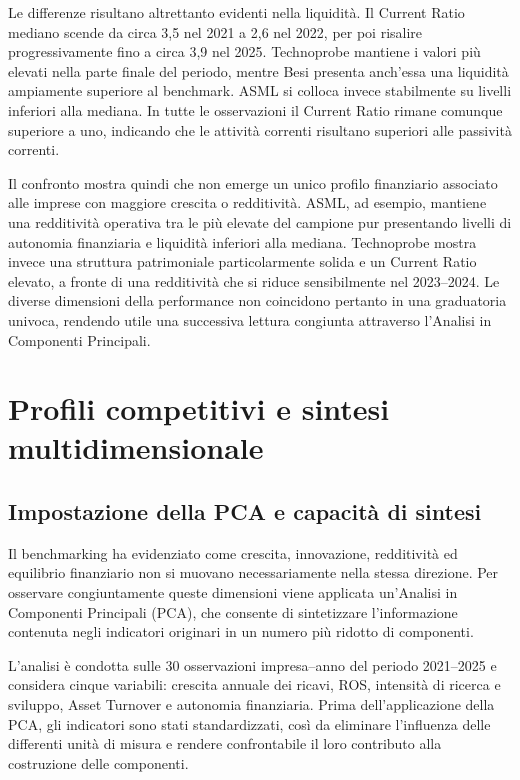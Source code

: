 \documentclass[11pt,a4paper]{article}
\begin{document}
Le differenze risultano altrettanto evidenti nella liquidità. Il Current Ratio mediano scende da circa 3,5 nel 2021 a 2,6 nel 2022, per poi risalire progressivamente fino a circa 3,9 nel 2025. Technoprobe mantiene i valori più elevati nella parte finale del periodo, mentre Besi presenta anch'essa una liquidità ampiamente superiore al benchmark. ASML si colloca invece stabilmente su livelli inferiori alla mediana. In tutte le osservazioni il Current Ratio rimane comunque superiore a uno, indicando che le attività correnti risultano superiori alle passività correnti.

Il confronto mostra quindi che non emerge un unico profilo finanziario associato alle imprese con maggiore crescita o redditività. ASML, ad esempio, mantiene una redditività operativa tra le più elevate del campione pur presentando livelli di autonomia finanziaria e liquidità inferiori alla mediana. Technoprobe mostra invece una struttura patrimoniale particolarmente solida e un Current Ratio elevato, a fronte di una redditività che si riduce sensibilmente nel 2023--2024. Le diverse dimensioni della performance non coincidono pertanto in una graduatoria univoca, rendendo utile una successiva lettura congiunta attraverso l'Analisi in Componenti Principali.

\section{Profili competitivi e sintesi multidimensionale}

\subsection{Impostazione della PCA e capacità di sintesi}

Il benchmarking ha evidenziato come crescita, innovazione, redditività ed equilibrio finanziario non si muovano necessariamente nella stessa direzione. Per osservare congiuntamente queste dimensioni viene applicata un'Analisi in Componenti Principali (PCA), che consente di sintetizzare l'informazione contenuta negli indicatori originari in un numero più ridotto di componenti.

L'analisi è condotta sulle 30 osservazioni impresa--anno del periodo 2021--2025 e considera cinque variabili: crescita annuale dei ricavi, ROS, intensità di ricerca e sviluppo, Asset Turnover e autonomia finanziaria. Prima dell'applicazione della PCA, gli indicatori sono stati standardizzati, così da eliminare l'influenza delle differenti unità di misura e rendere confrontabile il loro contributo alla costruzione delle componenti.
\end{document}
